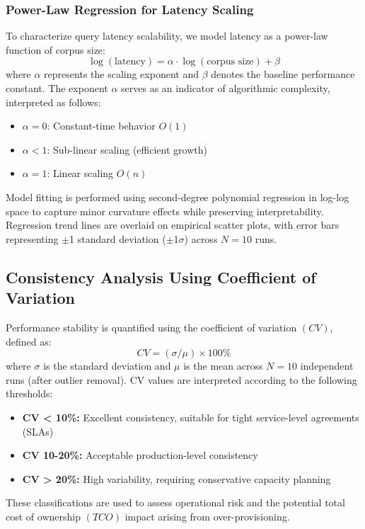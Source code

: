 \documentclass{article}
\begin{document}
\subsubsection{Power-Law Regression for Latency Scaling}
To characterize query latency scalability, we model latency as a power-law function of corpus size: 
\begin{equation}
\log(\text{latency}) = \alpha \cdot \log(\text{corpus size}) + \beta
\end{equation}
where $\alpha$ represents the scaling exponent and $\beta$ denotes the baseline performance constant. The exponent $\alpha$ serves as an indicator of algorithmic complexity, interpreted as follows:
\begin{itemize}
    \item $\alpha=0$: Constant-time behavior $O(1)$
    \item $\alpha<1$: Sub-linear scaling (efficient growth)
    \item $\alpha=1$: Linear scaling $O(n)$
\end{itemize}
Model fitting is performed using second-degree polynomial regression in log-log space to capture minor curvature effects while preserving interpretability. Regression trend lines are overlaid on empirical scatter plots, with error bars representing $\pm$1 standard deviation ($\pm$1$\sigma$) across $N=10$ runs.

\subsection{Consistency Analysis Using Coefficient of Variation}
Performance stability is quantified using the coefficient of variation $(CV)$, defined as:
\begin{equation}
CV = (\sigma / \mu) \times 100\%
\end{equation}
where $\sigma$ is the standard deviation and $\mu$ is the mean across $N = 10$ independent runs (after outlier removal). CV values are interpreted according to the following thresholds:
\begin{itemize}
    \item \textbf{CV < 10\%:} Excellent consistency, suitable for tight service-level agreements (SLAs)
    \item \textbf{CV 10-20\%:} Acceptable production-level consistency
    \item \textbf{CV > 20\%:} High variability, requiring conservative capacity planning
\end{itemize}
These classifications are used to assess operational risk and the potential total cost of ownership $(TCO)$ impact arising from over-provisioning.
\end{document}
